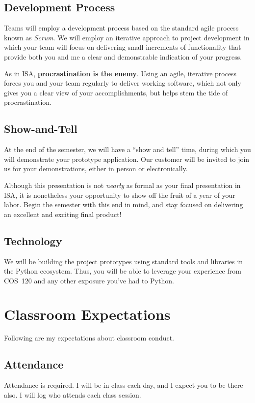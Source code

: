 \documentclass{article}
\begin{document}
\subsection{Development Process}
\label{sec:orgheadline6}
Teams will employ a development process
based on the standard agile process known as \emph{Scrum}.
We will employ an iterative approach to project development
in which your team will focus on delivering
small increments of functionality
that provide both you and me a clear and demonstrable indication of your progress.

As in ISA, \textbf{procrastination is the enemy}.
Using an agile, iterative process forces you and your team
regularly to deliver working software,
which not only gives you a clear view of your accomplishments,
but helps stem the tide of procrastination.
\subsection{Show-and-Tell}
\label{sec:orgheadline7}
At the end of the semester, we will have a ``show and tell'' time,
during which you will demonstrate your prototype application.
Our customer will be invited to join us for your demonstrations,
either in person or electronically.

Although this presentation is not \emph{nearly} as formal as your final presentation in ISA,
it is nonetheless your opportunity to show off the fruit of a year of your labor.
Begin the semester with this end in mind,
and stay focused on delivering an excellent and exciting final product!
\subsection{Technology}
\label{sec:orgheadline8}
We will be building the project prototypes using
standard tools and libraries in the Python ecosystem.
Thus, you will be able to leverage your experience
from COS~120 and any other exposure you've had to Python.
\section{Classroom Expectations}
\label{sec:orgheadline13}
Following are my expectations about classroom conduct.
\subsection{Attendance}
\label{sec:orgheadline10}
Attendance is required. I will be in class each day,
and I expect you to be there also.
I will log who attends each class session.
\end{document}
